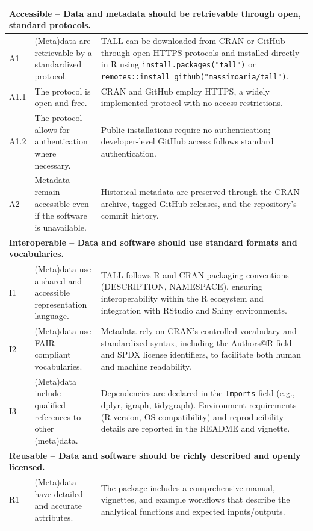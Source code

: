 \documentclass[8pt,a4paper]{article}
\begin{document}
\begin{longtable}{p{1.5cm} p{6cm} p{8.5cm}}
\multicolumn{3}{l}{\textbf{Accessible -- Data and metadata should be retrievable through open, standard protocols.}} \\
\midrule
A1 & (Meta)data are retrievable by a standardized protocol. & TALL can be downloaded from CRAN or GitHub through open HTTPS protocols and installed directly in R using \texttt{install.packages("tall")} or \texttt{remotes::install\_github("massimoaria/tall")}. \\
A1.1 & The protocol is open and free. & CRAN and GitHub employ HTTPS, a widely implemented protocol with no access restrictions. \\
A1.2 & The protocol allows for authentication where necessary. & Public installations require no authentication; developer-level GitHub access follows standard authentication. \\
A2 & Metadata remain accessible even if the software is unavailable. & Historical metadata are preserved through the CRAN archive, tagged GitHub releases, and the repository's commit history. \\
\midrule
\multicolumn{3}{l}{\textbf{Interoperable -- Data and software should use standard formats and vocabularies.}} \\
\midrule
I1 & (Meta)data use a shared and accessible representation language. & TALL follows \textsf{R} and CRAN packaging conventions (\textsf{DESCRIPTION}, \textsf{NAMESPACE}), ensuring interoperability within the \textsf{R} ecosystem and integration with RStudio and Shiny environments. \\
I2 & (Meta)data use FAIR-compliant vocabularies. & Metadata rely on CRAN's controlled vocabulary and standardized syntax, including the \textsf{Authors@R} field and SPDX license identifiers, to facilitate both human and machine readability. \\
I3 & (Meta)data include qualified references to other (meta)data. & Dependencies are declared in the \texttt{Imports} field (e.g., \textsf{dplyr}, \textsf{igraph}, \textsf{tidygraph}). Environment requirements (\textsf{R} version, OS compatibility) and reproducibility details are reported in the \textsf{README} and vignette. \\
\midrule
\multicolumn{3}{l}{\textbf{Reusable -- Data and software should be richly described and openly licensed.}} \\
\midrule
R1 & (Meta)data have detailed and accurate attributes. & The package includes a comprehensive manual, vignettes, and example workflows that describe the analytical functions and expected inputs/outputs. \\

\end{longtable}
\end{document}
